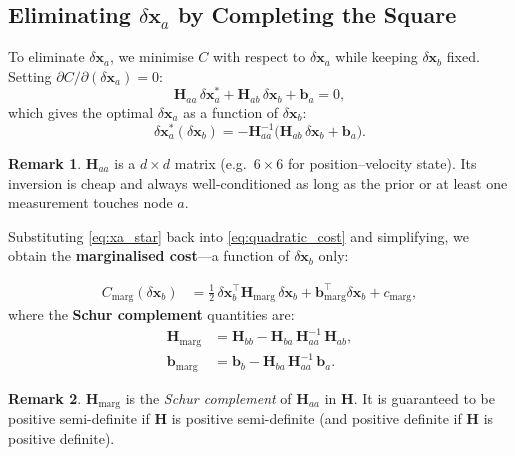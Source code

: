 \documentclass[11pt,a4paper]{article}
\newcommand{\bx}{\bm{x}}
\newcommand{\bb}{\bm{b}}
\newcommand{\bH}{\bm{H}}
\theoremstyle{definition}
\newtheorem{remark}{Remark}[section]
\theoremstyle{plain}
\begin{document}
\subsection{Eliminating $\delta\bx_a$ by Completing the Square}

To eliminate $\delta\bx_a$, we minimise $C$ with respect to $\delta\bx_a$
while keeping $\delta\bx_b$ fixed.  Setting
$\partial C / \partial (\delta\bx_a) = 0$:
\begin{equation}
  \bH_{aa}\,\delta\bx_a^* + \bH_{ab}\,\delta\bx_b + \bb_a = 0,
\end{equation}
which gives the optimal $\delta\bx_a$ as a function of $\delta\bx_b$:
\begin{equation}
  \boxed{
    \delta\bx_a^*(\delta\bx_b) =
      -\bH_{aa}^{-1}\bigl(\bH_{ab}\,\delta\bx_b + \bb_a\bigr).
  }
  \label{eq:xa_star}
\end{equation}

\begin{remark}
  $\bH_{aa}$ is a $d \times d$ matrix (e.g.\ $6 \times 6$ for
  position--velocity state).  Its inversion is cheap and always
  well-conditioned as long as the prior or at least one measurement
  touches node $a$.
\end{remark}

Substituting \eqref{eq:xa_star} back into \eqref{eq:quadratic_cost}
and simplifying, we obtain the \textbf{marginalised cost}—a
function of $\delta\bx_b$ only:

\begin{keybox}
\begin{align}
  C_{\text{marg}}(\delta\bx_b) &=
    \frac{1}{2}\,\delta\bx_b^\top \bH_{\text{marg}}\,\delta\bx_b
    + \bb_{\text{marg}}^\top \delta\bx_b + c_{\text{marg}},
  \label{eq:marg_cost}
\end{align}
where the \textbf{Schur complement} quantities are:
\begin{align}
  \bH_{\text{marg}} &= \bH_{bb} - \bH_{ba}\,\bH_{aa}^{-1}\,\bH_{ab},
  \label{eq:H_schur} \\[4pt]
  \bb_{\text{marg}} &= \bb_b - \bH_{ba}\,\bH_{aa}^{-1}\,\bb_a.
  \label{eq:b_schur}
\end{align}
\end{keybox}

\begin{remark}
  $\bH_{\text{marg}}$ is the \emph{Schur complement} of $\bH_{aa}$ in $\bH$.
  It is guaranteed to be positive semi-definite if $\bH$ is positive
  semi-definite (and positive definite if $\bH$ is positive definite).
\end{remark}
\end{document}
